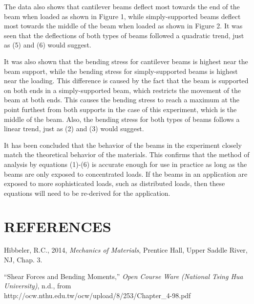 \documentclass[12pt]{article}
\begin{document}
The data also shows that cantilever beams deflect most towards the end of the beam when loaded as shown in Figure 1, while simply-supported beams deflect most towards the middle of the beam when loaded as shown in Figure 2. It was seen that the deflections of both types of beams followed a quadratic trend, just as (5) and (6) would suggest.
\bigskip

It was also shown that the bending stress for cantilever beams is highest near the beam support, while the bending stress for simply-supported beams is highest near the loading. This difference is caused by the fact that the beam is supported on both ends in a simply-supported beam, which restricts the movement of the beam at both ends. This causes the bending stress to reach a maximum at the point furthest from both supports in the case of this experiment, which is the middle of the beam. Also, the bending stress for both types of beams follows a linear trend, just as (2) and (3) would suggest.
\bigskip

It has been concluded that the behavior of the beams in the experiment closely match the theoretical behavior of the materials. This confirms that the method of analysis by equations (1)-(6) is accurate enough for use in practice as long as the beams are only exposed to concentrated loads. If the beams in an application are exposed to more sophisticated loads, such as distributed loads, then these equations will need to be re-derived for the application.
\bigskip


\section*{\fontsize{12}{12}\selectfont REFERENCES}

\begin{thebibliography}{2}

\bibitem{}
Hibbeler, R.C., 2014, \emph{Mechanics of Materials}, Prentice Hall, Upper Saddle River, NJ, Chap. 3.

\bibitem{}
“Shear Forces and Bending Moments,” \emph{Open Course Ware (National Tsing Hua University)}, n.d., from
\\http://ocw.nthu.edu.tw/ocw/upload/8/253/Chapter\_4-98.pdf


\end{thebibliography}


\end{document}
